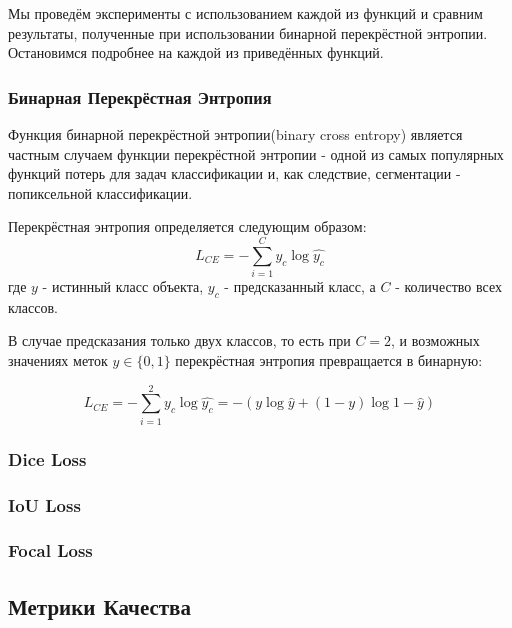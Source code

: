 Мы проведём эксперименты с использованием каждой из функций и сравним результаты, полученные при использовании бинарной перекрёстной энтропии.
Остановимся подробнее на каждой из приведённых функций.

\subsubsection{Бинарная Перекрёстная Энтропия}

Функция бинарной перекрёстной энтропии(binary cross entropy) является частным случаем функции перекрёстной энтропии - одной из самых популярных 
функций потерь для задач классификации и, как следствие, сегментации - попиксельной классификации.

Перекрёстная энтропия \cite{CE} определяется следующим образом: 
\begin{equation}
    L_{CE} = -\sum_{i=1}^{C}y_c\log{\hat{y_c}}
\end{equation}
где $y$ - истинный класс объекта, $y_c$ - предсказанный класс, а $C$ - количество 
всех классов.

В случае предсказания только двух классов, то есть при $C=2$, 
и возможных значениях меток $y \in \{0,1\}$
перекрёстная энтропия превращается в бинарную:

\begin{equation}
    L_{CE} = -\sum_{i=1}^{2}y_c\log{\hat{y_c}} = 
    -(y\log{\hat{y}} + (1-y)\log{1-\hat{y}})
\end{equation}


\subsubsection{Dice Loss} 

\subsubsection{IoU Loss}

\subsubsection{Focal Loss}


\subsection{Метрики Качества}

